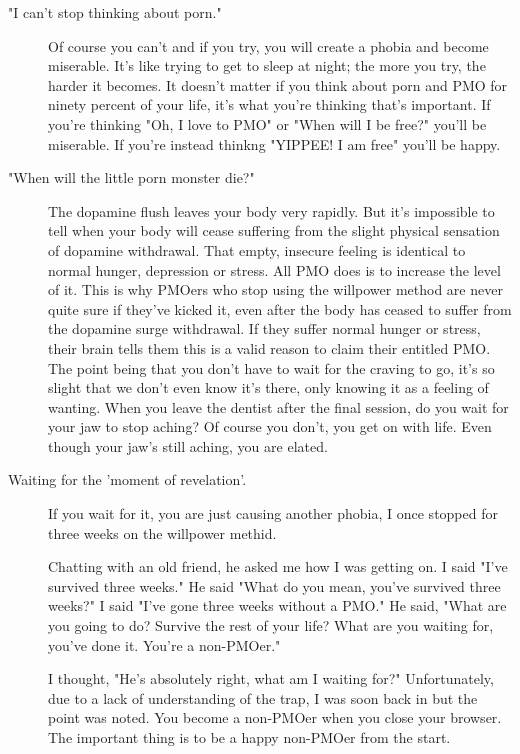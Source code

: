 \documentclass[easypeasy.tex]{subfiles}
\begin{document}
\begin{description}
    \begin{description} 
    \item["I can't stop thinking about porn."]
      Of course you can't and if you try, you will create a phobia and become miserable. It's like trying to get to sleep at night; the more you try, the harder it becomes. It doesn't matter if you think about porn and PMO for ninety percent of your life, it's what you're thinking that's important. If you're thinking "Oh, I love to PMO" or "When will I be free?" you'll be miserable. If you're instead thinkng "YIPPEE! I am free" you'll be happy.

      \item["When will the little porn monster die?"]
        The dopamine flush leaves your body very rapidly. But it's impossible to tell when your body will cease suffering from the slight physical sensation of dopamine withdrawal. That empty, insecure feeling is identical to normal hunger, depression or stress. All PMO does is to increase the level of it. This is why PMOers who stop using the willpower method are never quite sure if they've kicked it, even after the body has ceased to suffer from the dopamine surge withdrawal. If they suffer normal hunger or stress, their brain tells them this is a valid reason to claim their entitled PMO. The point being that you don't have to wait for the craving to go, it's so slight that we don't even know it's there, only knowing it as a feeling of wanting. When you leave the dentist after the final session, do you wait for your jaw to stop aching? Of course you don't, you get on with life. Even though your jaw's still aching, you are elated.

      \item [Waiting for the 'moment of revelation'.] If you wait for it, you are just causing another phobia, I once stopped for three weeks on the willpower methid.

      Chatting with an old friend, he asked me how I was getting on.
      I said "I've survived three weeks."
      He said "What do you mean, you've survived three weeks?"
      I said "I've gone three weeks without a PMO."
      He said, "What are you going to do? Survive the rest of your life? What are you waiting for, you've done it. You're a non-PMOer."

      I thought, "He's absolutely right, what am I waiting for?" Unfortunately, due to a lack of understanding of the trap, I was soon back in but the point was noted. You become a non-PMOer when you close your browser. The important thing is to be a happy non-PMOer from the start.


\end{description}
\end{description}
\end{document}

